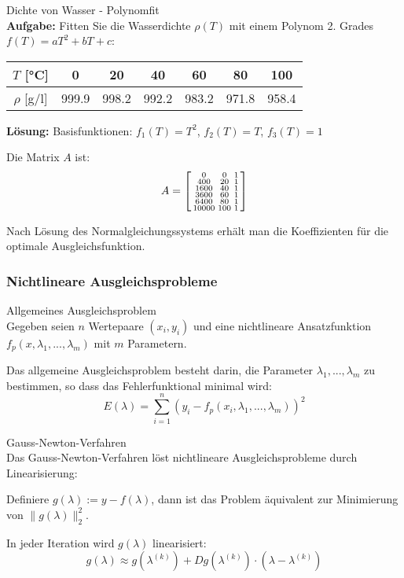 \begin{example2}{Dichte von Wasser - Polynomfit}\\
\textbf{Aufgabe:} Fitten Sie die Wasserdichte $\rho(T)$ mit einem Polynom 2. Grades $f(T) = aT^2 + bT + c$:
\begin{center}
\begin{tabular}{|c|c|c|c|c|c|c|}
\hline
$T$ [°C] & 0 & 20 & 40 & 60 & 80 & 100 \\
\hline
$\rho$ [g/l] & 999.9 & 998.2 & 992.2 & 983.2 & 971.8 & 958.4 \\
\hline
\end{tabular}
\end{center}
\tcblower
\textbf{Lösung:}
Basisfunktionen: $f_1(T) = T^2$, $f_2(T) = T$, $f_3(T) = 1$

Die Matrix $A$ ist:
$$A = \begin{bsmallmatrix}
0 & 0 & 1 \\
400 & 20 & 1 \\
1600 & 40 & 1 \\
3600 & 60 & 1 \\
6400 & 80 & 1 \\
10000 & 100 & 1
\end{bsmallmatrix}$$

Nach Lösung des Normalgleichungssystems erhält man die Koeffizienten für die optimale Ausgleichsfunktion.
\end{example2}

\subsubsection{Nichtlineare Ausgleichsprobleme}

\begin{definition}{Allgemeines Ausgleichsproblem}\\
Gegeben seien $n$ Wertepaare $(x_i, y_i)$ und eine nichtlineare Ansatzfunktion $f_p(x, \lambda_1, ..., \lambda_m)$ mit $m$ Parametern.

Das allgemeine Ausgleichsproblem besteht darin, die Parameter $\lambda_1, ..., \lambda_m$ zu bestimmen, so dass das Fehlerfunktional minimal wird:
$$E(\lambda) = \sum_{i=1}^{n} (y_i - f_p(x_i, \lambda_1, ..., \lambda_m))^2$$
\end{definition}

\begin{concept}{Gauss-Newton-Verfahren}\\
Das Gauss-Newton-Verfahren löst nichtlineare Ausgleichsprobleme durch Linearisierung:

Definiere $g(\lambda) := y - f(\lambda)$, dann ist das Problem äquivalent zur Minimierung von $\|g(\lambda)\|_2^2$.

In jeder Iteration wird $g(\lambda)$ linearisiert:
$$g(\lambda) \approx g(\lambda^{(k)}) + Dg(\lambda^{(k)}) \cdot (\lambda - \lambda^{(k)})$$
\end{concept}

